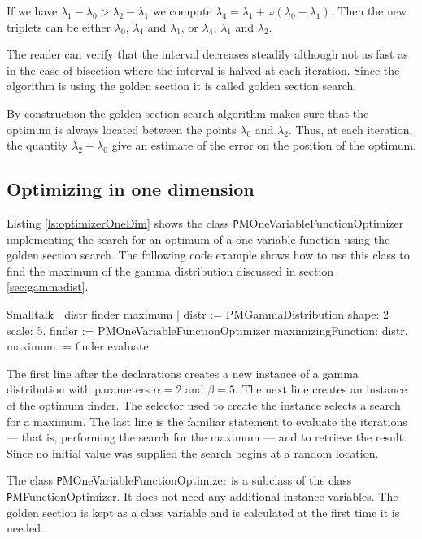 If we have $\lambda_1-\lambda_0>\lambda_2-\lambda_1$ we compute
$\lambda_4 =\lambda_1 + \omega\left(\lambda_0-\lambda_1\right)$.
Then the new triplets can be either $\lambda_0$, $\lambda_4$ and
$\lambda_1$, or $\lambda_4$, $\lambda_1$ and $\lambda_2$.

The reader can verify that the interval decreases steadily
although not as fast as in the case of bisection where the
interval is halved at each iteration.
Since the algorithm is using the golden section it is called golden section search.

By construction the golden section search algorithm makes sure
that the optimum is always located between the points $\lambda_0$
and $\lambda_2$. Thus, at each iteration, the quantity
$\lambda_2-\lambda_0$ give an estimate of the error on the
position of the optimum.

\subsection{Optimizing in one dimension}
Listing \ref{ls:optimizerOneDim} shows the class {\texttt
PMOneVariableFunctionOptimizer} implementing the search for an
optimum of a one-variable function using the golden section
search.
The following code example shows how to use this class to
find the maximum of the gamma distribution discussed in section
\ref{sec:gammadist}.

\begin{displaycode}{Smalltalk}
| distr finder maximum |
   distr := PMGammaDistribution shape: 2 scale: 5.
   finder := PMOneVariableFunctionOptimizer maximizingFunction: distr.
   maximum := finder evaluate
\end{displaycode}

The first line after the declarations creates a new instance of a
gamma distribution with parameters $\alpha = 2$ and $\beta = 5$.
The next line creates an instance of the optimum finder. The
selector used to create the instance selects a search for a
maximum. The last line is the familiar statement to evaluate the
iterations --- that is, performing the search for the maximum ---
and to retrieve the result. Since no initial value was supplied
the search begins at a random location.

The class {\texttt PMOneVariableFunctionOptimizer} is a subclass of
the class {\texttt PMFunctionOptimizer}. It does not need any additional
instance variables. The golden section is kept as a class variable
and is calculated at the first time it is needed.

